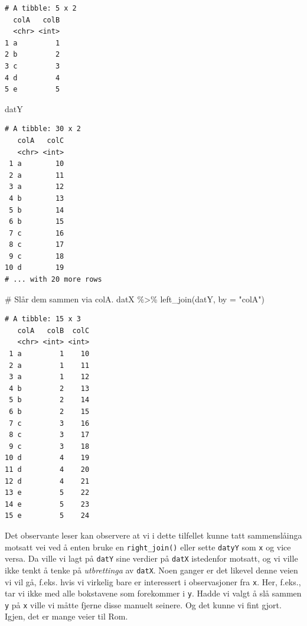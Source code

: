\documentclass[
  letterpaper,
  DIV=11,
  numbers=noendperiod]{scrreprt}
\newenvironment{Shaded}{\begin{snugshade}}{\end{snugshade}}
\newcommand{\AttributeTok}[1]{\textcolor[rgb]{0.40,0.45,0.13}{#1}}
\newcommand{\CommentTok}[1]{\textcolor[rgb]{0.37,0.37,0.37}{#1}}
\newcommand{\FunctionTok}[1]{\textcolor[rgb]{0.28,0.35,0.67}{#1}}
\newcommand{\NormalTok}[1]{\textcolor[rgb]{0.00,0.23,0.31}{#1}}
\newcommand{\SpecialCharTok}[1]{\textcolor[rgb]{0.37,0.37,0.37}{#1}}
\newcommand{\StringTok}[1]{\textcolor[rgb]{0.13,0.47,0.30}{#1}}
\begin{document}
\begin{verbatim}
# A tibble: 5 x 2
  colA   colB
  <chr> <int>
1 a         1
2 b         2
3 c         3
4 d         4
5 e         5
\end{verbatim}

\begin{Shaded}
\begin{Highlighting}[]
\NormalTok{datY}
\end{Highlighting}
\end{Shaded}

\begin{verbatim}
# A tibble: 30 x 2
   colA   colC
   <chr> <int>
 1 a        10
 2 a        11
 3 a        12
 4 b        13
 5 b        14
 6 b        15
 7 c        16
 8 c        17
 9 c        18
10 d        19
# ... with 20 more rows
\end{verbatim}

\begin{Shaded}
\begin{Highlighting}[]
\CommentTok{\# Slår dem sammen via colA.}
\NormalTok{datX }\SpecialCharTok{\%\textgreater{}\%} \FunctionTok{left\_join}\NormalTok{(datY, }\AttributeTok{by =} \StringTok{"colA"}\NormalTok{)}
\end{Highlighting}
\end{Shaded}

\begin{verbatim}
# A tibble: 15 x 3
   colA   colB  colC
   <chr> <int> <int>
 1 a         1    10
 2 a         1    11
 3 a         1    12
 4 b         2    13
 5 b         2    14
 6 b         2    15
 7 c         3    16
 8 c         3    17
 9 c         3    18
10 d         4    19
11 d         4    20
12 d         4    21
13 e         5    22
14 e         5    23
15 e         5    24
\end{verbatim}

Det observante leser kan observere at vi i dette tilfellet kunne tatt
sammenslåinga motsatt vei ved å enten bruke en \texttt{right\_join()}
eller sette \texttt{datyY} som \texttt{x} og vice versa. Da ville vi
lagt på \texttt{datY} sine verdier på \texttt{datX} istedenfor motsatt,
og vi ville ikke tenkt å tenke på \emph{utbrettinga} av \texttt{datX}.
Noen ganger er det likevel denne veien vi vil gå, f.eks. hvis vi
virkelig bare er interessert i observasjoner fra \texttt{x}. Her,
f.eks., tar vi ikke med alle bokstavene som forekommer i \texttt{y}.
Hadde vi valgt å slå sammen \texttt{y} på \texttt{x} ville vi måtte
fjerne disse manuelt seinere. Og det kunne vi fint gjort. Igjen, det er
mange veier til Rom.
\end{document}

